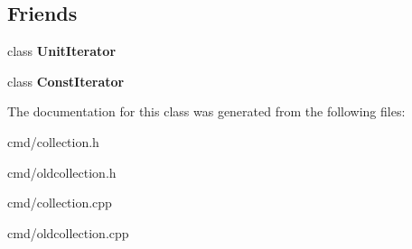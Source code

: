\subsection*{Friends}
\begin{DoxyCompactItemize}
\item 
class {\bfseries Unit\+Iterator}\hypertarget{classUnitCollection_a72628ec20f2786601b5d3d82e6818674}{}\label{classUnitCollection_a72628ec20f2786601b5d3d82e6818674}

\item 
class {\bfseries Const\+Iterator}\hypertarget{classUnitCollection_a5485970bb9da6b5d782fa28638b5658f}{}\label{classUnitCollection_a5485970bb9da6b5d782fa28638b5658f}

\end{DoxyCompactItemize}


The documentation for this class was generated from the following files\+:\begin{DoxyCompactItemize}
\item 
cmd/collection.\+h\item 
cmd/oldcollection.\+h\item 
cmd/collection.\+cpp\item 
cmd/oldcollection.\+cpp\end{DoxyCompactItemize}

